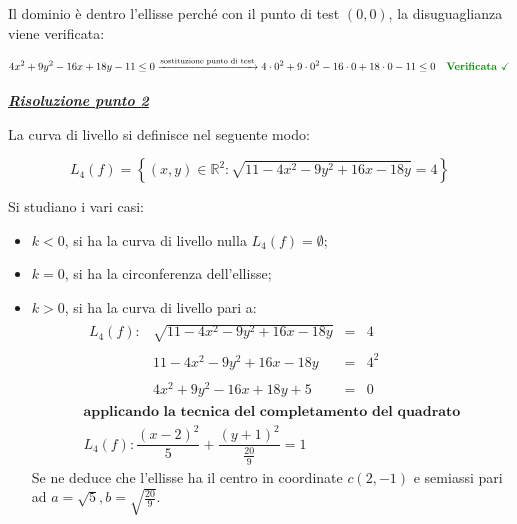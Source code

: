 \documentclass[a4paper]{article}
\begin{document}
	\noindent
	Il dominio è dentro l'ellisse perché con il punto di test $\left(0,0\right)$, la disuguaglianza viene verificata:
	
	\begin{equation*}
		4x^{2} + 9y^{2} - 16x +18y - 11 \le 0 \xrightarrow{\text{sostituzione punto di test}} 4 \cdot 0^{2} + 9 \cdot 0^{2} - 16 \cdot 0 + 18 \cdot 0 - 11 \le 0 \textcolor{Green4}{\textbf{ \: Verificata \checkmark}}
	\end{equation*}

	\noindent
	\textcolor{Green4}{\textbf{\underline{\emph{Risoluzione punto 2}}}}\newline
	
	\noindent
	La curva di livello si definisce nel seguente modo:
	
	\begin{equation*}
		L_{4}\left(f\right) = \left\{\left(x,y\right) \in \mathbb{R}^{2} : \sqrt{11 - 4x^{2} - 9y^{2} + 16x - 18y} = 4\right\}
	\end{equation*}

	\noindent
	Si studiano i vari casi:
	
	\begin{itemize}[label=-]
		\item $k < 0$, si ha la curva di livello nulla $L_{4}\left(f\right) = \emptyset$;
		
		\item $k = 0$, si ha la circonferenza dell'ellisse;
		
		\item $k > 0$, si ha la curva di livello pari a:
		\begin{gather*}
			\begin{array}{lrll}
				L_{4}\left(f\right):& \sqrt{11 - 4x^{2} - 9y^{2} + 16x - 18y}	& = & 4 \\
				&&& \\
									& 11 - 4x^{2} - 9y^{2} + 16x - 18y			& = & 4^{2} \\
				&&& \\
									& 4x^{2} + 9y^{2} - 16x + 18y + 5			& = & 0
			\end{array}
			\\
			\textbf{applicando la tecnica del completamento del quadrato}\\
			L_{4}\left(f\right): \dfrac{\left(x - 2\right)^{2}}{5} + \dfrac{\left(y + 1\right)^{2}}{\frac{20}{9}} = 1
		\end{gather*}
		Se ne deduce che l'ellisse ha il centro in coordinate $c\left(2,-1\right)$ e semiassi pari ad $a = \sqrt{5}, b = \sqrt{\frac{20}{9}}$.
	\end{itemize}
	
\end{document}
